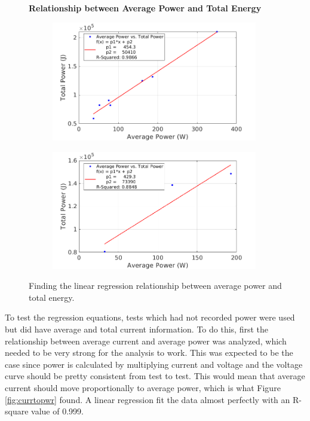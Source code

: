 \documentclass{article}
\begin{document}
\begin{figure}
\centering
\large{\textbf{Relationship between Average Power and Total Energy}}\par
\begin{subfigure}[b]{0.5\textwidth}
  \centering
   \includegraphics[width=90mm]{images/AvgTotPwr.png}
\end{subfigure}%
\begin{subfigure}[b]{0.5\textwidth}
  \centering
  \includegraphics[width=90mm]{images/AvgTotPwr2.png}
\end{subfigure}
\caption{Finding the linear regression relationship between average power and total energy.}
\label{fig:avgtotpwr}
\end{figure}

To test the regression equations, tests which had not recorded power were used but did have average and total current information. To do this, first the relationship between average current and average power was analyzed, which needed to be very strong for the analysis to work. This was expected to be the case since power is calculated by multiplying current and voltage and the voltage curve should be pretty consistent from test to test. This would mean that average current should move proportionally to average power, which is what Figure \ref{fig:currtopwr} found. A linear regression fit the data almost perfectly with an R-square value of 0.999. 
\end{document}
